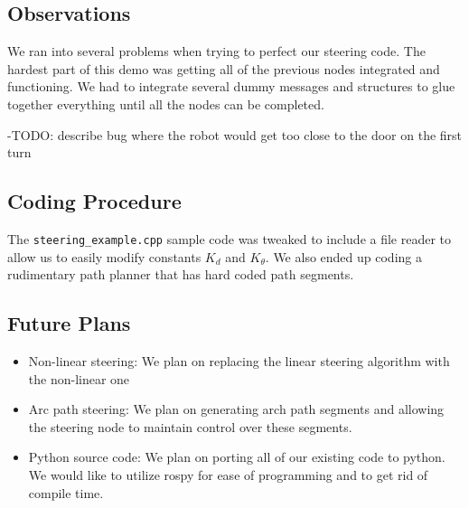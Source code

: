 \subsection{Observations}

We ran into several problems when trying to perfect our steering code.
The hardest part of this demo was getting all of the previous nodes
integrated and functioning. We had to integrate several dummy messages
and structures to glue together everything until all the nodes can be
completed.

-TODO: describe bug where the robot would get too close to the door on
the first turn

\subsection{Coding Procedure}

The \texttt{steering\_example.cpp} sample code was tweaked to include a
file reader to allow us to easily modify constants $K_d$ and $K_\theta$.
We also ended up coding a rudimentary path planner that has hard coded
path segments.

\subsection{Future Plans}

\begin{itemize}
\item
  Non-linear steering: We plan on replacing the linear steering
  algorithm with the non-linear one
\item
  Arc path steering: We plan on generating arch path segments and
  allowing the steering node to maintain control over these segments.
\item
  Python source code: We plan on porting all of our existing code to
  python. We would like to utilize rospy for ease of programming and to
  get rid of compile time.
\end{itemize}

